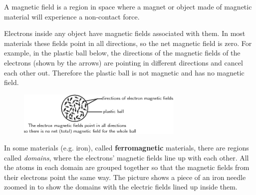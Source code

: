       \label{m37830*id128332}A magnetic field is a region in space where a magnet or object made of magnetic material will experience a non-contact force.\par 
      \label{m37830*id128337}Electrons inside any object have magnetic fields associated
with them. In most materials these fields point in all
directions, so the net magnetic field is zero. For example, in the plastic ball below,
the directions of the magnetic fields of the electrons (shown by the arrows) are pointing
in different directions and cancel each other out. Therefore the plastic ball is not magnetic and
has no magnetic field.\par 
      \label{m37830*id128346}
        
    \setcounter{subfigure}{0}


	\begin{figure}[H] %
    \begin{center}
    \label{m37830*id128349!!!underscore!!!media}\label{m37830*id128349!!!underscore!!!printimage}\includegraphics[width=300px]{col11305.imgs/m37830_PG10C7_001.png} %
        
      \vspace{2pt}
    \vspace{.1in}
    
    \end{center}

 \end{figure}   

    \addtocounter{footnote}{-0}
    
      \par 
      \label{m37830*id128355}In some materials (e.g. iron), called \textbf{ferromagnetic} materials, there are regions called \textsl{domains}, where the electrons' magnetic fields line up with each other. All the atoms in each domain are grouped together so that the magnetic fields from their electrons point the same way. The picture shows a piece of an iron needle zoomed in to show the domains with the electric fields lined up inside them.\par 
      \label{m37830*id128371}
        
    \setcounter{subfigure}{0}


